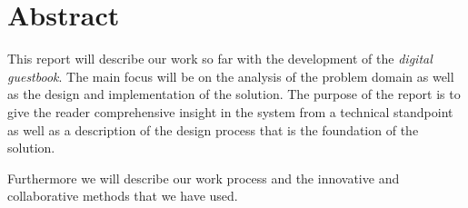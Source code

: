 \chapter{Abstract}

This report will describe our work so far with the development of the \emph{digital guestbook}. The main focus will be on the analysis of the problem domain as well as the design and implementation of the solution. The purpose of the report is to give the reader comprehensive insight in the system from a technical standpoint as well as a description of the design process that is the foundation of the solution.

Furthermore we will describe our work process and the innovative and collaborative methods that we have used.